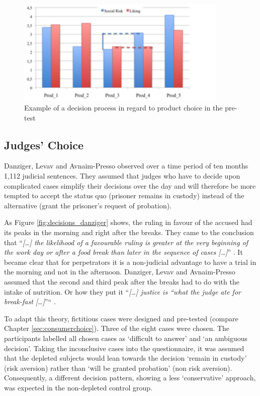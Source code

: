 \begin{figure}[h!]
\center
	\includegraphics[width=0.9\textwidth]{images/pretest_sample.png}
  \caption{Example of a decision process in regard to product choice in the pre-test}\label{fig:decision_process}
\end{figure}

\subsection{Judges’ Choice}\label{sec:judgeschoice}
Danziger, Levav and Avnaim-Presso \citep{danziger2011extraneous} observed over a time period of ten months 1,112 judicial sentences. They assumed that judges who have to decide upon complicated cases simplify their decisions over the day and will therefore be more tempted to accept the status quo (prisoner remains in custody) instead of the alternative (grant the prisoner’s request of probation).\par
As Figure \ref{fig:decisions_danziger} shows, the ruling in favour of the accused had its peaks in the morning and right after the breaks. They came to the conclusion that “\emph{[\ldots] the likelihood of a favourable ruling is greater at the very beginning of the work day or after a food break than later in the sequence of cases [\ldots]}” \citep[p.~6890]{danziger2011extraneous}. It became clear that for perpetrators it is a non-judicial advantage to have a trial in the morning and not in the afternoon. Danziger, Levav and Avnaim-Presso assumed that the second and third peak after the breaks had to do with the intake of nutrition. Or how they put it “\emph{[\ldots] justice is “what the judge ate for break-fast [\ldots]}”“ \cite[p.~6889]{danziger2011extraneous}. \par
To adapt this theory, fictitious cases were designed and pre-tested (compare Chapter \ref{sec:consumerchoice}). Three of the eight cases were chosen. The participants labelled all chosen cases as ‘difficult to answer’ and ‘an ambiguous decision’. Taking the inconclusive cases into the questionnaire, it was assumed that the depleted subjects would lean towards the decision ‘remain in custody’ (risk aversion) rather than ‘will be granted probation’ (non risk aversion). Consequently, a different decision pattern, showing a less ‘conservative’ approach, was expected in the non-depleted control group.\par

